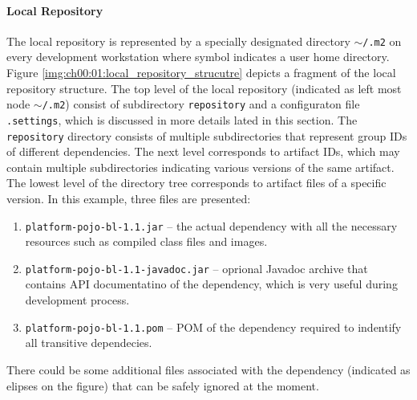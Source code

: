   \paragraph*{Local Repository}
  The local repository is represented by a specially designated directory \texttt{$\sim$/.m2} on every development workstation where symbol \tikzinline{$\sim$} indicates a user home directory.
  Figure \ref{img:ch00:01:local_repository_strucutre} depicts a fragment of the local repository structure.
  The top level of the local repository (indicated as left most node \texttt{$\sim$/.m2}) consist of subdirectory \texttt{repository} and a configuraton file \texttt{.settings}, which is discussed in more details lated in this section.
  The \texttt{repository} directory consists of multiple subdirectories that represent group IDs of different dependencies.
  The next level corresponds to artifact IDs, which may contain multiple subdirectories indicating various versions of the same artifact.
  The lowest level of the directory tree corresponds to artifact files of a specific version.
  In this example, three files are presented:
  \begin{enumerate}
    \item \texttt{platform-pojo-bl-1.1.jar} -- the actual dependency with all the necessary resources such as compiled class files and images.
    \item \texttt{platform-pojo-bl-1.1-javadoc.jar} -- oprional Javadoc archive that contains API documentatino of the dependency, which is very useful during development process.
    \item \texttt{platform-pojo-bl-1.1.pom} -- POM of the dependency required to indentify all transitive dependecies.
  \end{enumerate}
  There could be some additional files associated with the dependency (indicated as elipses on the figure) that can be safely ignored at the moment.

